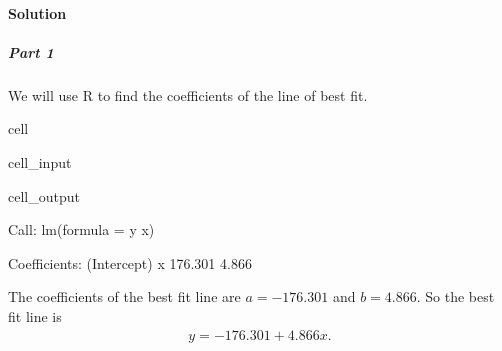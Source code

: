 \documentclass[letterpaper,10pt,english]{jupyterBook}
\begin{document}
\paragraph{Solution}
\label{\detokenize{Ch8 Correlation and Linear Regression/8.3 The Regression Equation:solution}}

\subparagraph{Part 1}
\label{\detokenize{Ch8 Correlation and Linear Regression/8.3 The Regression Equation:part-1}}
\sphinxAtStartPar
We will use R to find the coefficients of the line of best fit.

\begin{sphinxuseclass}{cell}\begin{sphinxVerbatimInput}

\begin{sphinxuseclass}{cell_input}
\begin{sphinxVerbatim}[commandchars=\\\{\}]

\end{sphinxVerbatim}

\end{sphinxuseclass}\end{sphinxVerbatimInput}
\begin{sphinxVerbatimOutput}

\begin{sphinxuseclass}{cell_output}
\begin{sphinxVerbatim}[commandchars=\\\{\}]
Call:
lm(formula = y \PYGZti{} x)

Coefficients:
(Intercept)            x  
   \PYGZhy{}176.301        4.866  
\end{sphinxVerbatim}

\end{sphinxuseclass}\end{sphinxVerbatimOutput}

\end{sphinxuseclass}
\sphinxAtStartPar
The coefficients of the best fit line are \(a = -176.301\) and \(b = 4.866\). So the best fit line is
\begin{equation*}
\begin{split} y= -176.301 + 4.866x. \end{split}
\end{equation*}
\end{document}
